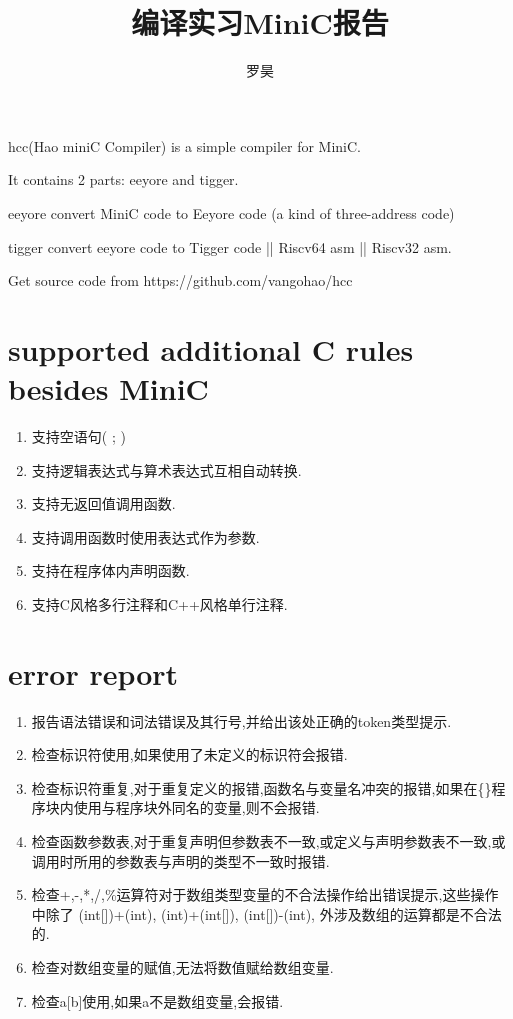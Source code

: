 \documentclass[UTF8]{article}
\begin{document}
\title{编译实习MiniC报告}
\author{罗昊}
\maketitle
hcc(Hao miniC Compiler) is a simple compiler for MiniC.

It contains 2 parts: eeyore and tigger. 

eeyore convert MiniC code to Eeyore code (a kind of three-address code)

tigger convert eeyore code to Tigger code || Riscv64 asm || Riscv32 asm.

Get source code from https://github.com/vangohao/hcc

\section{supported additional C rules besides MiniC}
\begin{enumerate}
\item 支持空语句( ; )

\item 支持逻辑表达式与算术表达式互相自动转换.

\item 支持无返回值调用函数.

\item 支持调用函数时使用表达式作为参数.

\item 支持在程序体内声明函数.

\item 支持C风格多行注释和C++风格单行注释.
\end{enumerate}
\section{error report}
\begin{enumerate}[1.]
\item 报告语法错误和词法错误及其行号,并给出该处正确的token类型提示.

\item 检查标识符使用,如果使用了未定义的标识符会报错.

\item 检查标识符重复,对于重复定义的报错,函数名与变量名冲突的报错,如果在\{\}程序块内使用与程序块外同名的变量,则不会报错.

\item 检查函数参数表,对于重复声明但参数表不一致,或定义与声明参数表不一致,或调用时所用的参数表与声明的类型不一致时报错.

\item 检查+,-,*,/,\%运算符对于数组类型变量的不合法操作给出错误提示,这些操作中除了 (int[])+(int), (int)+(int[]), (int[])-(int), 外涉及数组的运算都是不合法 的.

\item 检查对数组变量的赋值,无法将数值赋给数组变量.

\item 检查a[b]使用,如果a不是数组变量,会报错.
\end{enumerate}
\end{document}
